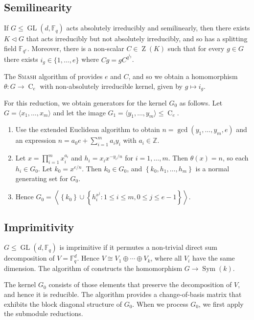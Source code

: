 \documentclass[12pt,twoside,reqno,psamsfonts]{amsproc}
\numberwithin{equation}{section}
\numberwithin{figure}{section}
\newcounter{algorithm}
\theoremstyle{plain}
\theoremstyle{definition}
\theoremstyle{remark}
\providecommand{\abs}[1]{\left\lvert #1 \right\rvert}
\providecommand{\set}[1]{\left\lbrace #1 \right\rbrace}
\providecommand{\gen}[1]{\left\langle #1 \right\rangle}
\providecommand{\Sym}[1]{\operatorname{Sym}( #1 )}
\newcommand{\field}[1]{\mathbb{#1}}
\newcommand{\Z}{\field{Z}}
\newcommand{\F}{\field{F}}
\newcommand{\SMASH}{\textsc{Smash}}
\DeclareMathOperator{\GL}{GL}
\DeclareMathOperator{\Cent}{C}
\DeclareMathOperator{\Zent}{Z}
\begin{document}
\subsection{Semilinearity}
\label{semilinear}

If $G \leqslant \GL(d, \F_q)$ acts absolutely irreducibly and semilinearly, 
then there exists $K \triangleleft G$
that acts irreducibly but not absolutely irreducibly, and so has a splitting
field $\F_{q^e}$. Moreover, there is a non-scalar $C \in \Zent(K)$
such that for every $g \in G$ there exists $i_g \in \{1, \ldots, e \}$
where $Cg = gC^{q^{i_g}}$. 

The {\SMASH} algorithm of \cite{MR1407872} provides $e$ and $C$, 
and so we obtain a homomorphism $\theta:G \to \Cent_e$ with non-absolutely
irreducible kernel, given by $g \mapsto i_g$.

For this reduction, we obtain generators for the
kernel $G_0$ as follows.
Let $G = \langle x_1, \dotsc, x_m \rangle$ and 
let the image $G_1 = \langle y_1, \dotsc, y_m \rangle \leqslant \Cent_e$.
\begin{enumerate}
\item
Use the extended Euclidean
algorithm to obtain $n = \gcd(y_1, \dotsc, y_m, e)$ and an
expression $n = a_0 e + \sum_{i = 1}^m a_i y_i$ with $a_i \in \Z$.
\item Let $x = \prod_{i = 1}^m x_i^{a_i}$ and $h_i = x_i x^{-y_i/n}$ for
$i = 1, \dotsc, m$. Then $\theta(x) = n$, so each $h_i \in G_0$.
Let $k_0 = x^{e / n}$. Then $k_0 \in G_0$, and 
$\set{k_0,h_1, \dotsc, h_m}$ is a normal generating set for $G_0$.
\item Hence $G_0 = \gen{\set{k_0} \cup \set{h_i^{x^j} : 1 \leqslant i \leqslant m,
0 \leqslant j \leqslant e-1}}$.
\end{enumerate}

\subsection{Imprimitivity}
$G \leqslant \GL(d, \F_q)$ is imprimitive if it permutes a
non-trivial direct sum decomposition 
of $V = \F_q^d$. Hence $V \cong
V_1 \oplus \dotsm \oplus V_k$, where all $V_i$ have the same dimension.
The algorithm of \cite{primitivityalg} constructs the 
homomorphism $G \to \Sym{k}$. 

The kernel $G_0$ consists of those elements that preserve the 
decomposition of $V$, and hence it is reducible.
The algorithm provides a change-of-basis 
matrix that exhibits the block diagonal structure of $G_0$.
When we process $G_0$, we first apply the submodule reductions.
\end{document}
